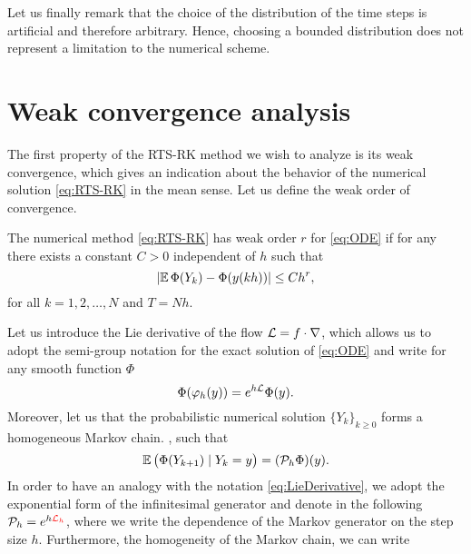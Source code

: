 \documentclass[10pt]{article}
\begin{document}
Let us finally remark that the choice of the distribution of the time steps is artificial and therefore arbitrary. Hence, choosing a bounded distribution does not represent a limitation to the numerical scheme.

\section{Weak convergence analysis}\label{sec:WeakOrder}

The first property of the RTS-RK method we wish to analyze is its weak convergence, which gives an indication about the behavior of the numerical solution \eqref{eq:RTS-RK} in the mean sense.  Let us define the weak order of convergence. 
\begin{definition} The numerical method \eqref{eq:RTS-RK} has weak order $r$ for \eqref{eq:ODE} if for any  there exists a constant $C > 0$ independent of $h$ such that
	\begin{equation}
		\lvert\operatorname{\mathbb{E}}\Phi(Y_k) - \Phi(y(kh))\rvert \leq Ch^r,
	\end{equation}
	for all $k = 1, 2, \ldots, N$ and $T = Nh$.
\end{definition} 
Let us introduce the Lie derivative of the flow $\mathcal{L} = f \cdot \nabla$, which allows us to adopt the semi-group notation for the exact solution of \eqref{eq:ODE}  and write for any smooth function $\Phi$
\begin{equation}\label{eq:LieDerivative}
	\Phi(\varphi_h(y)) = e^{h\mathcal{L}} \Phi(y).
\end{equation}
Moreover, let us  that the probabilistic numerical solution $\{Y_k\}_{k\geq 0}$ forms a homogeneous Markov chain. , such that
\begin{equation}
	\operatorname{\mathbb{E}} \big(\Phi(Y_{k+1})\mid Y_k = y\big) = (\mathcal{P}_h\Phi)(y).
\end{equation}
In order to have an analogy with the notation \eqref{eq:LieDerivative}, we adopt the exponential form of the infinitesimal generator and denote in the following $\mathcal{P}_h = e^{h{\color{red}\mathcal{L}_h}}$, where we  write the dependence of the Markov generator on the step size $h$. Furthermore,  the homogeneity of the Markov chain, we can write
\end{document}
